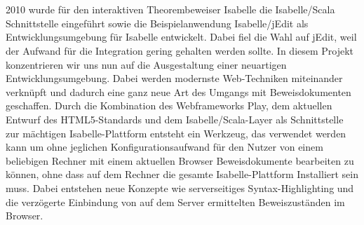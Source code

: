 \section*{\abstractname}

2010 wurde für den interaktiven Theorembeweiser Isabelle die Isabelle/Scala Schnittstelle eingeführt
sowie die Beispielanwendung Isabelle/jEdit als Entwicklungsumgebung für Isabelle entwickelt. Dabei
fiel die Wahl auf jEdit, weil der Aufwand für die Integration gering gehalten werden sollte. In
diesem Projekt konzentrieren wir uns nun auf die Ausgestaltung einer neuartigen
Entwicklungsumgebung. Dabei werden modernste Web-Techniken miteinander verknüpft und dadurch eine
ganz neue Art des Umgangs mit Beweisdokumenten geschaffen. Durch die Kombination des Webframeworks
Play, dem aktuellen Entwurf des HTML5-Standards und dem Isabelle/Scala-Layer als Schnittstelle zur
mächtigen Isabelle-Plattform entsteht ein Werkzeug, das verwendet werden kann um ohne jeglichen
Konfigurationsaufwand für den Nutzer von einem beliebigen Rechner mit einem aktuellen Browser
Beweisdokumente bearbeiten zu können, ohne dass auf dem Rechner die gesamte Isabelle-Plattform
Installiert sein muss. Dabei entstehen neue Konzepte wie serverseitiges Syntax-Highlighting und die
verzögerte Einbindung von auf dem Server ermittelten Beweiszuständen im Browser.